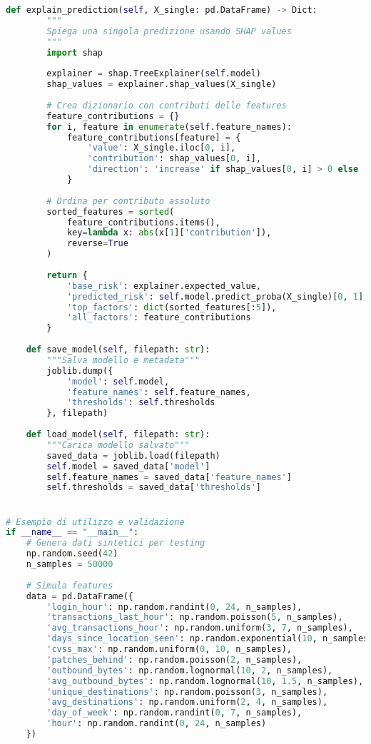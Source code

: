 \begin{lstlisting}[language=Python, caption=Implementazione Risk Scoring adattivo con XGBoost]
    def explain_prediction(self, X_single: pd.DataFrame) -> Dict:
        """
        Spiega una singola predizione usando SHAP values
        """
        import shap
        
        explainer = shap.TreeExplainer(self.model)
        shap_values = explainer.shap_values(X_single)
        
        # Crea dizionario con contributi delle features
        feature_contributions = {}
        for i, feature in enumerate(self.feature_names):
            feature_contributions[feature] = {
                'value': X_single.iloc[0, i],
                'contribution': shap_values[0, i],
                'direction': 'increase' if shap_values[0, i] > 0 else 'decrease'
            }
        
        # Ordina per contributo assoluto
        sorted_features = sorted(
            feature_contributions.items(),
            key=lambda x: abs(x[1]['contribution']),
            reverse=True
        )
        
        return {
            'base_risk': explainer.expected_value,
            'predicted_risk': self.model.predict_proba(X_single)[0, 1],
            'top_factors': dict(sorted_features[:5]),
            'all_factors': feature_contributions
        }
    
    def save_model(self, filepath: str):
        """Salva modello e metadata"""
        joblib.dump({
            'model': self.model,
            'feature_names': self.feature_names,
            'thresholds': self.thresholds
        }, filepath)
    
    def load_model(self, filepath: str):
        """Carica modello salvato"""
        saved_data = joblib.load(filepath)
        self.model = saved_data['model']
        self.feature_names = saved_data['feature_names']
        self.thresholds = saved_data['thresholds']


# Esempio di utilizzo e validazione
if __name__ == "__main__":
    # Genera dati sintetici per testing
    np.random.seed(42)
    n_samples = 50000
    
    # Simula features
    data = pd.DataFrame({
        'login_hour': np.random.randint(0, 24, n_samples),
        'transactions_last_hour': np.random.poisson(5, n_samples),
        'avg_transactions_hour': np.random.uniform(3, 7, n_samples),
        'days_since_location_seen': np.random.exponential(10, n_samples),
        'cvss_max': np.random.uniform(0, 10, n_samples),
        'patches_behind': np.random.poisson(2, n_samples),
        'outbound_bytes': np.random.lognormal(10, 2, n_samples),
        'avg_outbound_bytes': np.random.lognormal(10, 1.5, n_samples),
        'unique_destinations': np.random.poisson(3, n_samples),
        'avg_destinations': np.random.uniform(2, 4, n_samples),
        'day_of_week': np.random.randint(0, 7, n_samples),
        'hour': np.random.randint(0, 24, n_samples)
    })
    

\end{lstlisting}
